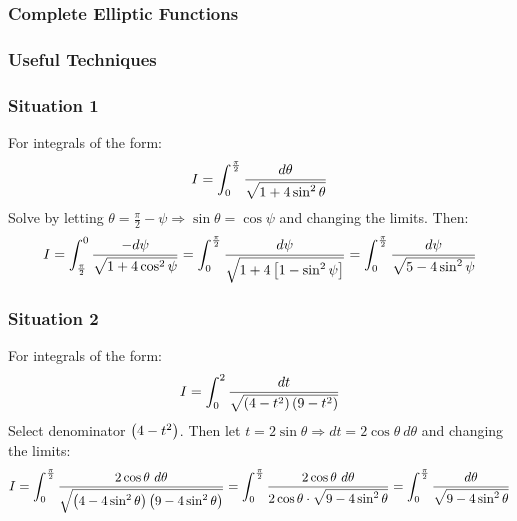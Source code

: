 \subsubsection{Complete Elliptic Functions}
\subsubsection{Useful Techniques}
\subsubsection*{Situation 1}
For integrals of the form:
\begin{equation}
    I=\int_{0}^{\frac{\pi}{2}}\frac{d\theta}{\sqrt{1+4\sin^2{\theta}}}
\end{equation}
Solve by letting $\theta=\frac{\pi}{2}-\psi\Rightarrow\sin\theta=\cos{\psi}$ and changing the limits. Then:
\begin{equation*}
    I=\int_{\frac{\pi}{2}}^{0}\frac{-d\psi}{\sqrt{1+4\cos^2\psi}}=\int_{0}^{\frac{\pi}{2}}\frac{d\psi}{\sqrt{1+4\left[1-\sin^2\psi\right]}}=\int_{0}^{\frac{\pi}{2}}\frac{d\psi}{\sqrt{5-4\sin^2\psi}}
\end{equation*}
\subsubsection*{Situation 2}
For integrals of the form:
\begin{equation}
    I=\int_{0}^{2}\frac{dt}{\sqrt{\left(4-t^2\right)\left(9-t^2\right)}}
\end{equation}
Select denominator $\left(4-t^2\right)$. Then let $t=2\sin\theta\Rightarrow dt=2\cos\theta\ d\theta$ and changing the limits:
\begin{equation}
    I=\intt{0}{\frac{\pi}{2}}\frac{2\cos\theta \ d\theta}{\sqrt{\bracket{4-4\sin^2\theta}\bracket{9-4\sin^2\theta}}}=\intt{0}{\frac{\pi}{2}}\frac{2\cos\theta \ d\theta}{2\cos\theta\cdot\sqrt{9-4\sin^2\theta}}=\intt{0}{\frac{\pi}{2}}\frac{d\theta}{\sqrt{9-4\sin^2\theta}}\nonumber
\end{equation}